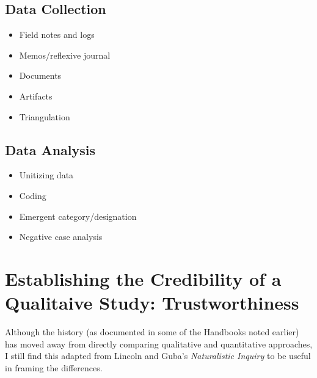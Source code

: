 \documentclass[
  english,
]{book}
\providecommand{\tightlist}{%
  \setlength{\itemsep}{0pt}\setlength{\parskip}{0pt}}
\begin{document}
\hypertarget{data-collection}{%
\subsection{Data Collection}\label{data-collection}}

\begin{itemize}
\tightlist
\item
  Field notes and logs
\item
  Memos/reflexive journal
\item
  Documents
\item
  Artifacts
\item
  Triangulation
\end{itemize}

\hypertarget{data-analysis}{%
\subsection{Data Analysis}\label{data-analysis}}

\begin{itemize}
\tightlist
\item
  Unitizing data
\item
  Coding
\item
  Emergent category/designation
\item
  Negative case analysis
\end{itemize}

\hypertarget{establishing-the-credibility-of-a-qualitaive-study-trustworthiness}{%
\section{Establishing the Credibility of a Qualitaive Study: Trustworthiness}\label{establishing-the-credibility-of-a-qualitaive-study-trustworthiness}}

Although the history (as documented in some of the Handbooks noted earlier) has moved away from directly comparing qualitative and quantitative approaches, I still find this adapted from Lincoln and Guba's \emph{Naturalistic Inquiry} \citeyearpar{lincoln_naturalistic_1985} to be useful in framing the differences.
\end{document}
